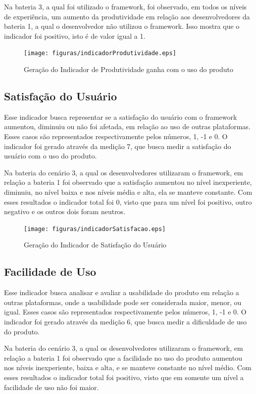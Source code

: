 Na bateria 3, a qual foi utilizado o framework, foi observado, em todos os níveis de experiência, um aumento da
produtividade em relação aos desenvolvedores da bateria 1, a qual o desenvolvedor não utilizou o framework. Isso
mostra que o indicador foi positivo, isto é de valor igual a 1.

\begin{figure}[H]
  \centering
  \label{fig:indicador1}
  \texttt{[image: figuras/indicadorProdutividade.eps]}
  \caption{Geração do Indicador de Produtividade ganha com o uso do produto}
\end{figure}

\subsection{Satisfação do Usuário}\label{ss:satifacao}

Esse indicador busca representar se a satisfação do usuário com o framework aumentou, diminuiu ou não foi afetada,
em relação ao uso de outras plataformas. Esses casos são representados respectivamente pelos números, 1, -1 e 0.
O indicador foi gerado através da medição 7, que busca medir a satisfação do usuário com o uso do produto.

Na bateria do cenário 3, a qual os desenvolvedores utilizaram o framework, em relação a bateria 1 foi observado que
a satisfação aumentou no nível inexperiente, diminuiu, no nível baixa e nos níveis média e alta, ela se manteve constante.
Com esses resultados o indicador total foi 0, visto que para um nível foi positivo, outro negativo e os outros dois
foram neutros.

\begin{figure}[H]
  \centering
  \label{fig:indicador2}
  \texttt{[image: figuras/indicadorSatisfacao.eps]}
  \caption{Geração do Indicador de Satisfação do Usuário}
\end{figure}

\subsection{Facilidade de Uso}

Esse indicador busca analisar e avaliar a usabilidade do produto em relação a outras plataformas, onde a usabilidade pode
ser considerada maior, menor, ou igual. Esses casos são representados respectivamente pelos números, 1, -1 e 0. O
indicador foi gerado através da medição 6, que busca medir a dificuldade de uso do produto.

Na bateria do cenário 3, a qual os desenvolvedores utilizaram o framework, em relação a bateria 1 foi observado que a
facilidade no uso do produto aumentou nos níveis inexperiente, baixa e alta, e se manteve constante no nível médio.
Com esses resultados o indicador total foi positivo, visto que em somente um nível a facilidade de uso não foi maior.

